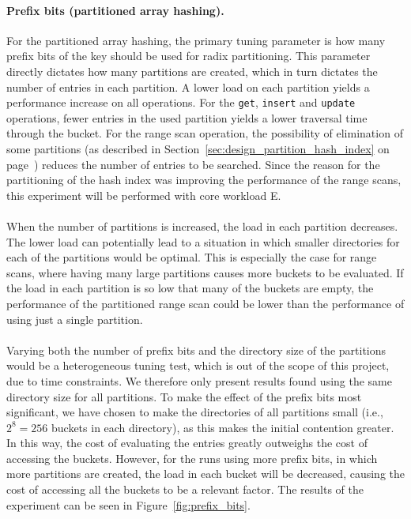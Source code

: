 \documentclass[11pt]{report} %
\begin{document}
\paragraph{Prefix bits (partitioned array hashing).} For the partitioned array hashing, the primary tuning parameter is how many prefix bits of the key should be used for radix partitioning. This parameter directly dictates how many partitions are created, which in turn dictates the number of entries in each partition. A lower load on each partition yields a performance increase on all operations. For the \verb|get|, \verb|insert| and \verb|update| operations, fewer entries in the used partition yields a lower traversal time through the bucket. For the range scan operation, the possibility of elimination of some partitions (as described in Section~\ref{sec:design_partition_hash_index} on page~\pageref{sec:design_partition_hash_index}) reduces the number of entries to be searched. Since the reason for the partitioning of the hash index was improving the performance of the range scans, this experiment will be performed with core workload E. \\
\\
When the number of partitions is increased, the load in each partition decreases. The lower load can potentially lead to a situation in which smaller directories for each of the partitions would be optimal. This is especially the case for range scans, where having many large partitions causes more buckets to be evaluated. If the load in each partition is so low that many of the buckets are empty, the performance of the partitioned range scan could be lower than the performance of using just a single partition.\\
\\
Varying both the number of prefix bits and the directory size of the partitions would be a heterogeneous tuning test, which is out of the scope of this project, due to time constraints. We therefore only present results found using the same directory size for all partitions. To make the effect of the prefix bits most significant, we have chosen to make the directories of all partitions small (i.e., $2^8 = 256$ buckets in each directory), as this makes the initial contention greater. In this way, the cost of evaluating the entries  greatly outweighs the cost of accessing the buckets. However, for the runs using more prefix bits, in which more partitions are created, the load in each bucket will be decreased, causing the cost of accessing all the buckets to be a relevant factor. The results of the experiment can be seen in Figure~\ref{fig:prefix_bits}.
\end{document}
